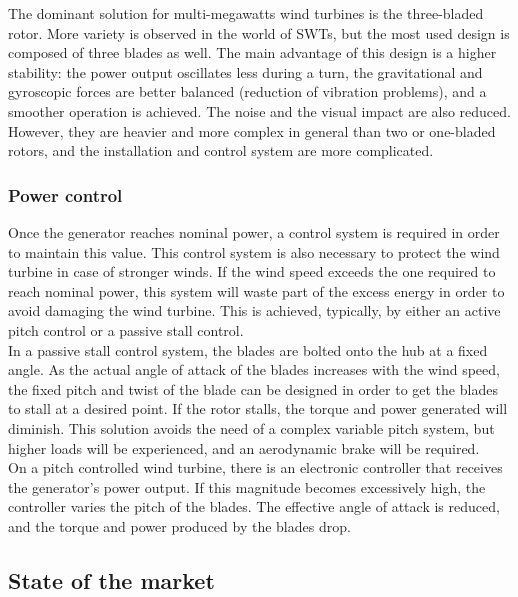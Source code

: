 \documentclass[../TFG_Report.tex]{subfiles}
\begin{document}
The dominant solution for multi-megawatts wind turbines is the three-bladed rotor. More variety is observed in the world of SWTs, but the most used design is composed of three blades as well. The main advantage of this design is a higher stability: the power output oscillates less during a turn, the gravitational and gyroscopic forces are better balanced (reduction of vibration problems), and a smoother operation is achieved. The noise and the visual impact are also reduced. However, they are heavier and more complex in general than two or one-bladed rotors, and the installation and control system are more complicated. \cite{Apunts}

\subsubsection{Power control}

Once the generator reaches nominal power, a control system is required in order to maintain this value. This control system is also necessary to protect the wind turbine in case of stronger winds. If the wind speed exceeds the one required to reach nominal power, this system will waste part of the excess energy in order to avoid damaging the wind turbine. This is achieved, typically, by either an active pitch control or a passive stall control. \\

In a passive stall control system, the blades are bolted onto the hub at a fixed angle. As the actual angle of attack of the blades increases with the wind speed, the fixed pitch and twist of the blade can be designed in order to get the blades to stall at a desired point. If the rotor stalls, the torque and power generated will diminish. This solution avoids the need of a complex variable pitch system, but higher loads will be experienced, and an aerodynamic brake will be required. \\

On a pitch controlled wind turbine, there is an electronic controller that receives the generator's power output. If this magnitude becomes excessively high, the controller varies the pitch of the blades. The effective angle of attack is reduced, and the torque and power produced by the blades drop. \cite{Dromstorre}



\subsection{State of the market} \label{State_market}
\end{document}
